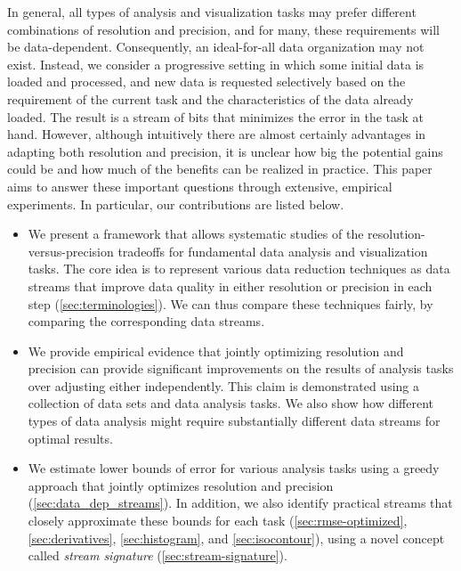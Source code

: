 In general, all types of analysis and visualization tasks may prefer different
combinations of 
resolution and precision, and for many, these requirements will be
data-dependent. Consequently, an ideal-for-all data organization may not exist. 
Instead, we consider a progressive setting in which some initial data is loaded
and processed, and new data is requested selectively based on the requirement
of the current task and the characteristics of the data already loaded. The
result is a stream of bits that minimizes the error in the task at hand.
However, although intuitively there are almost certainly advantages in adapting
both resolution and precision, it is unclear how big the potential gains could
be   and how much of the benefits can be
realized in practice.  This paper aims to answer these important questions
through extensive, empirical experiments. In particular, our contributions are
listed below.

\begin{itemize}
%
\item We present a framework that allows systematic studies of the
resolution-versus-precision tradeoffs for fundamental data analysis and
visualization tasks. The core idea is to represent various data reduction
techniques as data streams that improve data quality in either resolution or
precision in each step (\autoref{sec:terminologies}). We can
thus compare these techniques fairly, by comparing the corresponding data
streams.
%  
\item We provide empirical evidence that jointly optimizing resolution and
precision can provide significant improvements on the results of analysis tasks
over adjusting either independently.  This claim is demonstrated using a
collection of data sets and data analysis tasks. We also show how different
types of data analysis might require substantially different data streams for
optimal results.
%
\item We estimate lower bounds of error  for various analysis tasks using a greedy approach
that jointly optimizes resolution and precision (\autoref{sec:data_dep_streams}).
 In addition, we also identify practical streams that
closely approximate these bounds for each task (\autoref{sec:rmse-optimized},
\autoref{sec:derivatives}, \autoref{sec:histogram}, and \autoref{sec:isocontour}), using
a novel concept called \emph{stream signature} (\autoref{sec:stream-signature}).
\end{itemize}


